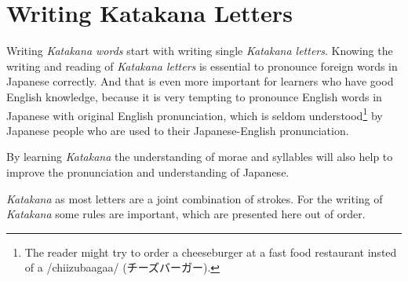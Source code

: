 \section{Writing Katakana Letters} 
\label{sec:WritingKatakanaLetters}

Writing \textit{Katakana words} start with writing single \textit{Katakana
letters}. Knowing the writing and reading of \textit{Katakana letters} is
essential to pronounce foreign words in Japanese correctly. And that is even
more important for learners who have good English knowledge, because it is very
tempting to pronounce English words in Japanese with original English
pronunciation, which is seldom understood\footnote{The reader might try to
order a cheeseburger at a fast food restaurant insted of a /chiizubaagaa/
(チーズバーガー).} by Japanese people who are used to their Japanese-English
pronunciation. 

By learning \textit{Katakana} the understanding of morae and syllables will
also help to improve the pronunciation and understanding of Japanese. 

\textit{Katakana} as most letters are a joint combination of strokes. For the
writing of \textit{Katakana} some rules are important, which are presented here
out of order.


